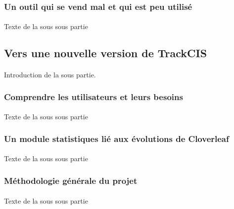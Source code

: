 		\subsubsection{Un outil qui se vend mal et qui est peu utilisé}
			\paragraph{}
			Texte de la sous sous partie
	
	\subsection{Vers une nouvelle version de TrackCIS}
		\paragraph{}
		Introduction de la sous partie.
		
		\subsubsection{Comprendre les utilisateurs et leurs besoins}
			\paragraph{}
			Texte de la sous sous partie
		\subsubsection{Un module statistiques lié aux évolutions de Cloverleaf}
			\paragraph{}
			Texte de la sous sous partie
		\subsubsection{Méthodologie générale du projet}
			\paragraph{}
			Texte de la sous sous partie
			